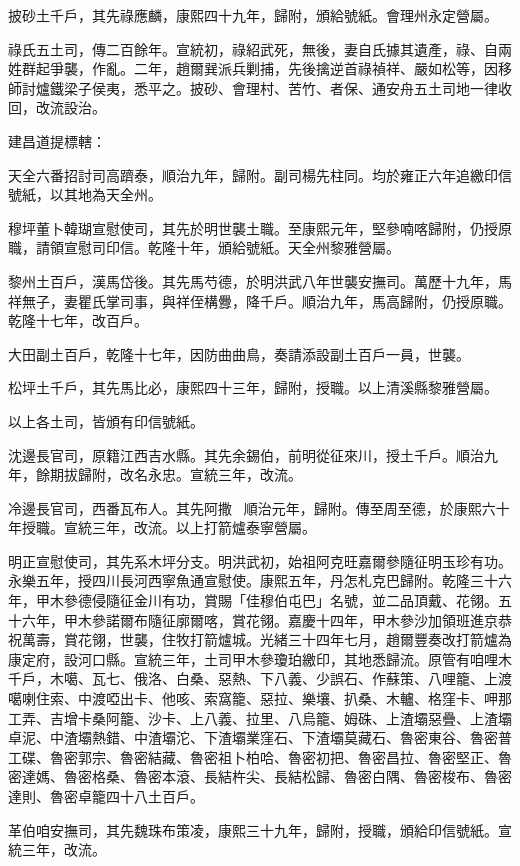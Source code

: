 \begin{pinyinscope}
披砂土千戶，其先祿應麟，康熙四十九年，歸附，頒給號紙。會理州永定營屬。

祿氏五土司，傳二百餘年。宣統初，祿紹武死，無後，妻自氏據其遺產，祿、自兩姓群起爭襲，作亂。二年，趙爾巽派兵剿捕，先後擒逆首祿禎祥、嚴如松等，因移師討爐鐵梁子侯夷，悉平之。披砂、會理村、苦竹、者保、通安舟五土司地一律收回，改流設治。

建昌道提標轄：

天全六番招討司高躋泰，順治九年，歸附。副司楊先柱同。均於雍正六年追繳印信號紙，以其地為天全州。

穆坪董卜韓瑚宣慰使司，其先於明世襲土職。至康熙元年，堅參喃喀歸附，仍授原職，請領宣慰司印信。乾隆十年，頒給號紙。天全州黎雅營屬。

黎州土百戶，漢馬岱後。其先馬芍德，於明洪武八年世襲安撫司。萬歷十九年，馬祥無子，妻瞿氏掌司事，與祥侄構釁，降千戶。順治九年，馬高歸附，仍授原職。乾隆十七年，改百戶。

大田副土百戶，乾隆十七年，因防曲曲鳥，奏請添設副土百戶一員，世襲。

松坪土千戶，其先馬比必，康熙四十三年，歸附，授職。以上清溪縣黎雅營屬。

以上各土司，皆頒有印信號紙。

沈邊長官司，原籍江西吉水縣。其先余錫伯，前明從征來川，授土千戶。順治九年，餘期拔歸附，改名永忠。宣統三年，改流。

冷邊長官司，西番瓦布人。其先阿撒，順治元年，歸附。傳至周至德，於康熙六十年授職。宣統三年，改流。以上打箭爐泰寧營屬。

明正宣慰使司，其先系木坪分支。明洪武初，始祖阿克旺嘉爾參隨征明玉珍有功。永樂五年，授四川長河西寧魚通宣慰使。康熙五年，丹怎札克巴歸附。乾隆三十六年，甲木參德侵隨征金川有功，賞賜「佳穆伯屯巴」名號，並二品頂戴、花翎。五十六年，甲木參諾爾布隨征廓爾喀，賞花翎。嘉慶十四年，甲木參沙加領班進京恭祝萬壽，賞花翎，世襲，住牧打箭爐城。光緒三十四年七月，趙爾豐奏改打箭爐為康定府，設河口縣。宣統三年，土司甲木參瓊珀繳印，其地悉歸流。原管有咱哩木千戶，木噶、瓦七、俄洛、白桑、惡熱、下八義、少誤石、作蘇策、八哩籠、上渡噶喇住索、中渡啞出卡、他咳、索窩籠、惡拉、樂壤、扒桑、木轤、格窪卡、呷那工弄、吉增卡桑阿籠、沙卡、上八義、拉里、八烏籠、姆硃、上渣壩惡疊、上渣壩卓泥、中渣壩熱錯、中渣壩沱、下渣壩業窪石、下渣壩莫藏石、魯密東谷、魯密普工碟、魯密郭宗、魯密結藏、魯密祖卜柏哈、魯密初把、魯密昌拉、魯密堅正、魯密達媽、魯密格桑、魯密本滾、長結杵尖、長結松歸、魯密白隅、魯密梭布、魯密達則、魯密卓籠四十八土百戶。

革伯咱安撫司，其先魏珠布策凌，康熙三十九年，歸附，授職，頒給印信號紙。宣統三年，改流。


\end{pinyinscope}
